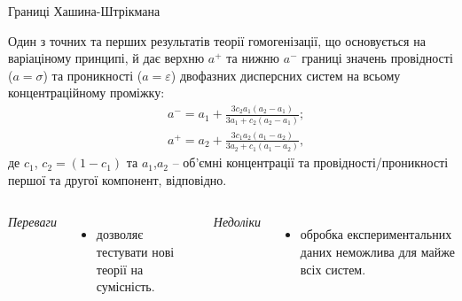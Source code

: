 \documentclass[10pt]{beamer}
\begin{document}
\begin{frame}{Границі Хашина-Штрікмана}

\footnotesize
    Один з точних та перших результатів теорії гомогенізації, що основується на варіаціному принципі, й дає верхню $a^{+}$ та нижню $a^{-}$ границі значень провідності ($a=\sigma$) та проникності ($a=\varepsilon$) двофазних дисперсних систем на всьому концентраційному проміжку:
    \begin{equation}\label{eq:HS-bounds}
    \begin{split}
    	&a^{-} = a_1 + \frac{3c_2 a_1(a_2-a_1)}{3a_1 + c_2(a_2-a_1)};\\
    	&a^{+} = a_2 + \frac{3c_1 a_2(a_1-a_2)}{3a_2 + c_1(a_1-a_2)},
    \end{split}
    \end{equation}
    де $c_{1}$, $c_2=(1-c_1)$ та $a_{1}$,$a_{2}$ -- об'ємні концентрації та провідності/проникності першої та другої компонент, відповідно.\par
    [Z. Hashin and S. Shtrikman, J. Appl. Phys. {\bf 33} (1962) 3125]
    \vspace{-5pt}
    \begin{columns}[T,onlytextwidth]
          \begin{center}
          {\it Переваги}
          \end{center}
          \vspace{-10pt}
          \begin{itemize}
              \item дозволяє тестувати нові теорії на сумісність.
          \end{itemize}
    
          \begin{center}
          {\it Недоліки}
          \end{center}
          \vspace{-10pt}
          \begin{itemize}
              \item обробка експериментальних даних неможлива для майже всіх систем.
          \end{itemize}
    \end{columns}
  
\end{frame}
\end{document}
